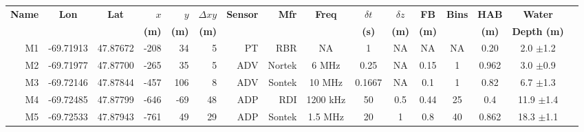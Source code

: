 \documentclass[letterpaper,10pt,landscape]{article}
\begin{document}
\thispagestyle{empty}



\begin{table}
  \label{t:mooring_table}
  \centering
  \begin{tabular}{|r|c|c|r|r|r|r|r|c|c|c|c|c|c|c|c|} \hline
    {\bf Name}          & {\bf Lon}                  & {\bf Lat}                 & $x$                    & $y$                  & $\Delta xy$         & {\bf Sensor} &{\bf Mfr}   & {\bf Freq}&$\delta t$ &$\delta z$& {\bf FB}   & {\bf Bins} & {\bf HAB}  & {\bf Water}                        \\
    ~                   &                            &                           & {\bf (m)}              & {\bf (m)}            & {\bf (m)}           &              &            &           & {\bf (s)} & {\bf (m)}& {\bf (m)}  &            & {\bf (m)}  & {\bf Depth (m)}                    \\\hline \hline
    M1                  & -69.71913                  & 47.87672                  & -208                   & 34                   & 5                   & PT           & RBR        & NA        & 1         & NA       & NA         & NA         & 0.20       &  2.0 $\pm$1.2                      \\\hline
    M2                  & -69.71977                  & 47.87700                  & -265                   & 35                   & 5                   & ADV          & Nortek     & 6 MHz     & 0.25      & NA       & 0.15       & 1          & 0.962      &  3.0 $\pm$0.9                      \\\hline %
    M3                  & -69.72146                  & 47.87844                  & -457                   & 106                  & 8                   & ADV          & Sontek     & 10 MHz    & 0.1667    & NA       & 0.1        & 1          & 0.82       &  6.7 $\pm$1.3                      \\\hline
    M4                  & -69.72485                  & 47.87799                  & -646                   & -69                  & 48                  & ADP          & RDI        & 1200 kHz  & 50        & 0.5      & 0.44       & 25         & 0.4        &  11.9 $\pm$1.4                     \\\hline
    \multirow{4}{*}{M5} & \multirow{4}{*}{-69.72533} & \multirow{4}{*}{47.87943} & \multirow{4}{*}{-761}  & \multirow{4}{*}{49}  & \multirow{4}{*}{29} & ADP          & Sontek     & 1.5 MHz   & 20        & 1        & 0.8        & 40         & 0.862      &  \multirow{4}{*}{18.3 $\pm$1.1}    \\ 

\end{tabular}
\end{table}
\end{document}
